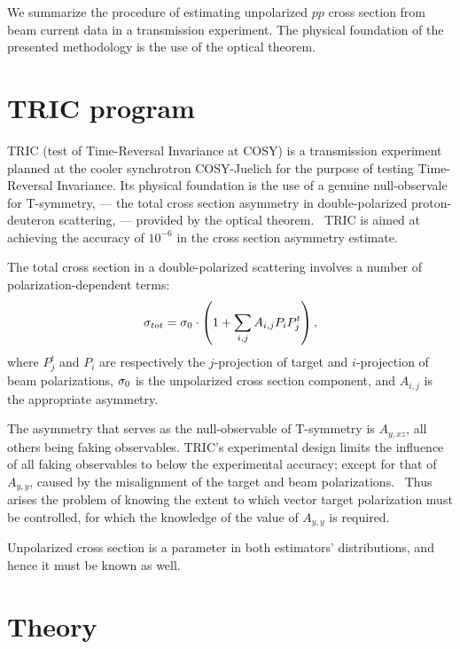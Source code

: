 \documentclass[reprint]{revtex4-1}
\begin{document}
\begin{abstractname}
We summarize the procedure of estimating unpolarized $pp$ cross section from beam current data in a transmission experiment. The  physical foundation of the presented methodology is the use of the optical theorem.
\end{abstractname}

\section{TRIC program}

TRIC (test of Time-Reversal Invariance at COSY) is a transmission experiment planned at the cooler synchrotron COSY-Juelich for the purpose of testing Time-Reversal Invariance. Its physical foundation is the use of a genuine null-observale for T-symmetry, --- the total cross section asymmetry in double-polarized proton-deuteron scattering, --- provided by the optical theorem.~\cite{Conzett} TRIC is aimed at achieving the accuracy of $10^{-6}$ in the cross section asymmetry estimate.

The total cross section in a double-polarized scattering involves a number of polarization-dependent terms:
\[
	\CS[tot] = \CS[0]\cdot\bkt{1 + \sum_{i,j} A_{i,j} P_iP^t_j},
\]
where $P^t_j$ and $P_i$ are respectively the $j$-projection of target and $i$-projection of beam polarizations, $\CS[0]$ is the unpolarized cross section component, and $A_{i,j}$ is the appropriate asymmetry.

The asymmetry that serves as the null-observable of T-symmetry is $A_{y,xz}$, all others being faking observables. TRIC's experimental design limits the influence of all faking observables to below the experimental accuracy; except for that of $A_{y,y}$, caused by the misalignment of the target and beam polarizations.~\cite[p. 11]{Proposal} Thus arises the problem of knowing the extent to which vector target polarization must be controlled, for which the knowledge of the value of $A_{y,y}$ is required. 

Unpolarized cross section is a parameter in both estimators' distributions, and hence it must be known as well. 

\section{Theory}
\end{document}
